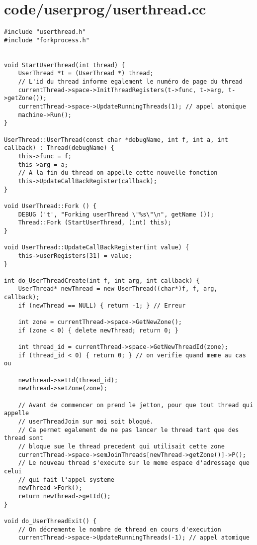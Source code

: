 \documentclass[a4paper,10pt]{article}
\begin{document}
\section{code/userprog/userthread.cc}
\begin{lstlisting}
#include "userthread.h"
#include "forkprocess.h"


void StartUserThread(int thread) {
    UserThread *t = (UserThread *) thread;
    // L'id du thread informe egalement le numéro de page du thread
    currentThread->space->InitThreadRegisters(t->func, t->arg, t->getZone());
    currentThread->space->UpdateRunningThreads(1); // appel atomique
    machine->Run();
}

UserThread::UserThread(const char *debugName, int f, int a, int callback) : Thread(debugName) {
    this->func = f;
    this->arg = a;
    // A la fin du thread on appelle cette nouvelle fonction
    this->UpdateCallBackRegister(callback);
}

void UserThread::Fork () {
    DEBUG ('t', "Forking userThread \"%s\"\n", getName ());
    Thread::Fork (StartUserThread, (int) this);
}

void UserThread::UpdateCallBackRegister(int value) {
    this->userRegisters[31] = value;
}

int do_UserThreadCreate(int f, int arg, int callback) {
    UserThread* newThread = new UserThread((char*)f, f, arg, callback);
    if (newThread == NULL) { return -1; } // Erreur

    int zone = currentThread->space->GetNewZone();
    if (zone < 0) { delete newThread; return 0; }

    int thread_id = currentThread->space->GetNewThreadId(zone);
    if (thread_id < 0) { return 0; } // on verifie quand meme au cas ou

    newThread->setId(thread_id);
    newThread->setZone(zone);

    // Avant de commencer on prend le jetton, pour que tout thread qui appelle
    // userThreadJoin sur moi soit bloqué.
    // Ca permet egalement de ne pas lancer le thread tant que des thread sont
    // bloque sue le thread precedent qui utilisait cette zone
    currentThread->space->semJoinThreads[newThread->getZone()]->P();
    // Le nouveau thread s'execute sur le meme espace d'adressage que celui
    // qui fait l'appel systeme
    newThread->Fork();
    return newThread->getId();
}

void do_UserThreadExit() {
    // On décremente le nombre de thread en cours d'execution
    currentThread->space->UpdateRunningThreads(-1); // appel atomique


\end{lstlisting}
\end{document}
